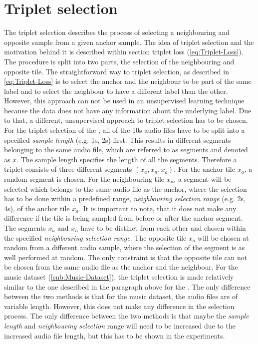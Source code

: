 \section{Triplet selection}
\label{sec:Triplet-Selection}
The triplet selection describes the process of selecting a neighbouring and opposite sample from a given anchor sample. The idea of triplet selection and the motivation behind it is described within section triplet loss (\ref{eq:Triplet-Loss}). The procedure is split into two parts, the selection of the neighbouring and opposite tile.
\newline
\newline
The straightforward way to triplet selection, as described in \ref{eq:Triplet-Loss} is to select the anchor and the neighbour to be part of the same label and to select the neighbour to have a different label than the other. However, this approach can not be used in an unsupervised learning technique because the data does not have any information about the underlying label. Due to that, a different, unsupervised approach to triplet selection has to be chosen.
\newline
\newline
For the triplet selection of the , all of the 10s audio files have to be split into a specified \textit{sample length} (e.g. 1s, 2s) first. This results in different segments belonging to the same audio file, which are referred to as segments and denoted as $x$. The sample length specifies the length of all the segments. Therefore a triplet consists of three different segments $(x_a, x_n, x_o)$.
\newline
For the anchor tile $x_a$, a random segment is chosen. For the neighbouring tile $x_n$, a segment will be selected which belongs to the same audio file as the anchor, where the selection has to be done within a predefined range, \textit{neighbouring selection range} (e.g. 2s, 4s), of the anchor tile $x_a$. It is important to note, that it does not make any difference if the tile is being sampled from before or after the anchor segment. The segments $x_a$ and $x_n$ have to be distinct from each other and chosen within the specified \textit{neighbouring selection range}.
\newline
The opposite tile $x_o$ will be chosen at random from a different audio sample, where the selection of the segment is as well performed at random. The only constraint is that the opposite tile can not be chosen from the same audio file as the anchor and the neighbour.
\newline
\newline
For the music dataset (\ref{sub:Music-Dataset}), the triplet selection is made relatively similar to the one described in the paragraph above for the . The only difference between the two methods is that for the music dataset, the audio files are of variable length. However, this does not make any difference in the selection process. The only difference between the two methods is that maybe the \textit{sample length} and \textit{neighbouring selection} range will need to be increased due to the increased audio file length, but this has to be shown in the experiments.

